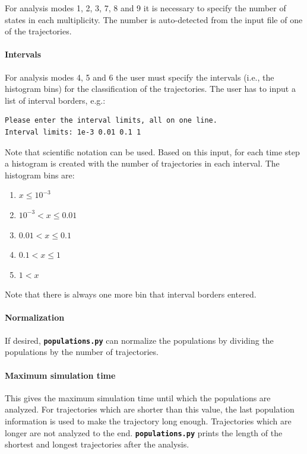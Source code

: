 \documentclass[a4paper,10pt,DIV=15,openany]{scrbook}
\newcommand{\ttt}[1]{\textbf{\texttt{#1}}}
\newenvironment{example}{
  \setlength{\OuterFrameSep}{3pt}
  \vspace{0mm}
  \definecolor{shadecolor}{HTML}{E4F4FF}
  \begin{shaded}
}{
  \end{shaded}
}
\begin{document}
For analysis modes 1, 2, 3, 7, 8 and 9 it is necessary to specify the number of states in each multiplicity. The number is auto-detected from the input file of one of the trajectories.

\paragraph{Intervals}

For analysis modes 4, 5 and 6 the user must specify the intervals (i.e., the histogram bins) for the classification of the trajectories. The user has to input a list of interval borders, e.g.:
\begin{example}
\begin{verbatim}
Please enter the interval limits, all on one line.
Interval limits: 1e-3 0.01 0.1 1
\end{verbatim}
\end{example}

Note that scientific notation can be used. Based on this input, for each time step a histogram is created with the number of trajectories in each interval. The histogram bins are:
\begin{enumerate}
  \item $x\leq10^{-3}$
  \item $10^{-3}<x\leq0.01$
  \item $0.01<x\leq0.1$
  \item $0.1<x\leq1$
  \item $1<x$
\end{enumerate}
Note that there is always one more bin that interval borders entered.

\paragraph{Normalization}

If desired, \ttt{populations.py} can normalize the populations by dividing the populations by the number of trajectories. 

\paragraph{Maximum simulation time}

This gives the maximum simulation time until which the populations are analyzed. For trajectories which are shorter than this value, the last population information is used to make the trajectory long enough. Trajectories which are longer are not analyzed to the end. \ttt{populations.py} prints the length of the shortest and longest trajectories after the analysis.
\end{document}
